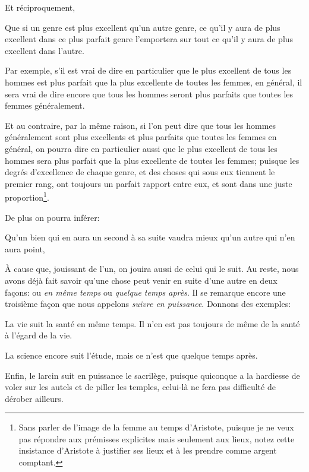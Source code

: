 Et réciproquement, 
\begin{lieu}
	Que si un genre est plus excellent qu'un autre genre, ce qu'il y aura de plus excellent dans ce plus parfait genre
	l'emportera sur tout ce qu'il y aura de plus excellent dans l'autre.
\end{lieu}

Par exemple, s'il est vrai de dire en particulier que le plus excellent de tous les hommes est plus parfait que la plus
excellente de toutes les femmes, en général, il sera vrai de dire encore que tous les hommes seront plus parfaits que
toutes les femmes généralement. 

Et au contraire, par la même raison, si l'on peut dire que tous les hommes généralement sont plus excellents et plus parfaits
que toutes les femmes en général, on pourra dire en particulier aussi que le plus excellent de tous les hommes sera plus
parfait que la plus excellente de toutes les femmes; puisque les degrés d'excellence de chaque genre, et des choses qui sous
eux tiennent le premier rang, ont toujours un parfait rapport entre eux, et sont dans une juste proportion\footnote{Sans parler
de l'image de la femme au temps d'Aristote, puisque je ne veux pas répondre aux prémisses explicites mais seulement aux lieux,
notez cette insistance d'Aristote à justifier ses lieux et à les prendre comme argent comptant.}.

\bigbreak 

De plus on pourra inférer:

\begin{lieu}
	Qu'un bien qui en aura un second à sa suite vaudra mieux qu'un autre qui n'en aura point,
\end{lieu}

À cause que, jouissant de l'un, on jouira aussi de celui qui le suit. Au reste, nous avons déjà fait
savoir qu'une chose peut venir en suite d'une autre en deux façons: ou \emph{en même temps} ou \emph{
quelque temps après}. Il se remarque encore une troisième façon que nous appelons \emph{suivre en 
puissance}. Donnons des exemples:

La vie suit la santé en même temps. Il n'en est pas toujours de même de la santé à l'égard de la vie.

La science encore suit l’étude, mais ce n'est que quelque temps après.

Enfin, le larcin suit en puissance le sacrilège, puisque quiconque a la hardiesse de voler sur les autels
et de piller les temples, celui-là ne fera pas difficulté de dérober ailleurs.

